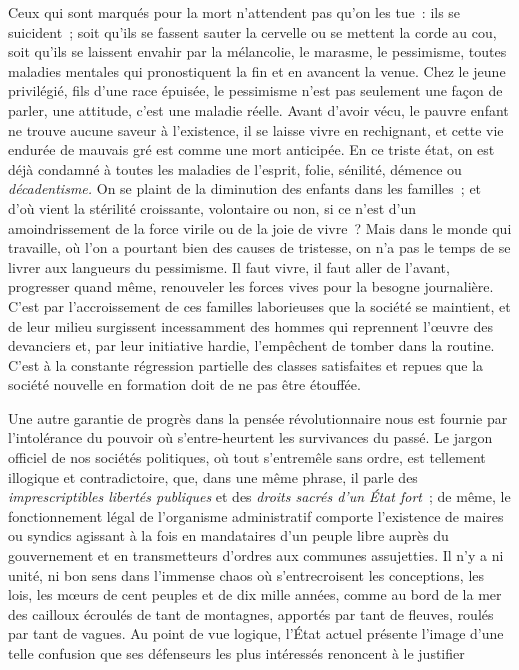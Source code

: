 \documentclass[french,twoside]{book} %
\begin{document}
Ceux qui sont marqués pour la mort n’attendent pas qu’on les tue : ils se suicident ; soit qu’ils se fassent sauter la cervelle ou se mettent la corde au cou, soit qu’ils se laissent envahir par la mélancolie, le marasme, le pessimisme, toutes maladies mentales qui pronostiquent la fin et en avancent la venue. Chez le jeune privilégié, fils d’une race épuisée, le pessimisme n’est pas seulement une façon de parler, une attitude, c’est une maladie réelle. Avant d’avoir vécu, le pauvre enfant ne trouve aucune saveur à l’existence, il se laisse vivre en rechignant, et cette vie endurée de mauvais gré est comme une mort  anticipée. En ce triste état, on est déjà condamné à toutes les maladies de l’esprit, folie, sénilité, démence ou \emph{décadentisme.} On se plaint de la diminution des enfants dans les familles ; et d’où vient la stérilité croissante, volontaire ou non, si ce n’est d’un amoindrissement de la force virile ou de la joie de vivre ? Mais dans le monde qui travaille, où l’on a pourtant bien des causes de tristesse, on n’a pas le temps de se livrer aux langueurs du pessimisme. Il faut vivre, il faut aller de l’avant, progresser quand même, renouveler les forces vives pour la besogne journalière. C’est par l’accroissement de ces familles laborieuses que la société se maintient, et de leur milieu surgissent incessamment des hommes qui reprennent l’œuvre  des devanciers et, par leur initiative hardie, l’empêchent de tomber dans la routine. C’est à la constante régression partielle des classes satisfaites et repues que la société nouvelle en formation doit de ne pas être étouffée.\par
Une autre garantie de progrès dans la pensée révolutionnaire nous est fournie par l’intolérance du pouvoir où s’entre-heurtent les survivances du passé. Le jargon officiel de nos sociétés politiques, où tout s’entremêle sans ordre, est tellement illogique et contradictoire, que, dans une même phrase, il parle des \emph{imprescriptibles libertés publiques} et des \emph{droits sacrés d’un État fort} ; de même, le fonctionnement légal de l’organisme administratif comporte l’existence de maires ou syndics agissant à la  fois en mandataires d’un peuple libre auprès du gouvernement et en transmetteurs d’ordres aux communes assujetties. Il n’y a ni unité, ni bon sens dans l’immense chaos où s’entrecroisent les conceptions, les lois, les mœurs de cent peuples et de dix mille années, comme au bord de la mer des cailloux écroulés de tant de montagnes, apportés par tant de fleuves, roulés par tant de vagues. Au point de vue logique, l’État actuel présente l’image d’une telle confusion que ses défenseurs les plus intéressés renoncent à le justifier\par
\end{document}
